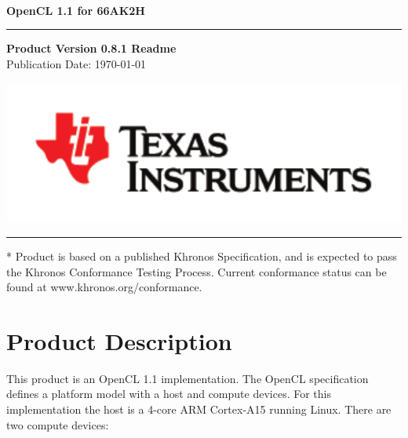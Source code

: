 \documentclass[10pt]{article}
\begin{document}
\begin{titlepage}

\vspace {50mm}
{\Large \bfseries OpenCL\textsuperscript{\texttrademark} 1.1 for 66AK2H}\\
\rule{6in}{2pt}

\begin{center}
\vspace {15 mm}
{ \Large \bfseries Product Version 0.8.1 Readme \\[3mm] }
{ \large Publication Date: \today \\ }
\end{center}

\vfill

\includegraphics[scale=0.4]{tiStk2cRgb.pdf}\\
\vspace {2mm}
\rule{6in}{2pt}
{\small
* Product is based on a published Khronos Specification, and is expected to
pass the Khronos Conformance Testing Process. Current conformance status can
be found at www.khronos.org/conformance.
}
\end{titlepage}

\newpage

\tableofcontents

\newpage

\section{Product Description}

This product is an OpenCL 1.1 implementation.  The OpenCL specification
defines a platform model with a host and compute devices.  For this
implementation the host is a 4-core ARM Cortex-A15 running Linux. There are two 
compute devices: 
\end{document}
